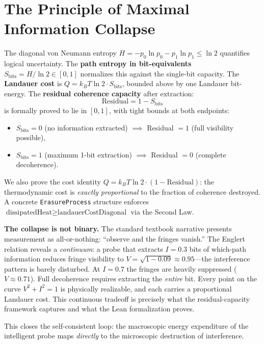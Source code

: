 \documentclass[10pt, a4paper]{article}
\begin{document}
\section{The Principle of Maximal Information Collapse}

The diagonal von Neumann entropy $H = -p_0 \ln p_0 - p_1 \ln p_1 \le \ln 2$ quantifies logical uncertainty. The \textbf{path entropy in bit-equivalents} $S_{\text{bits}} = H / \ln 2 \in [0, 1]$ normalizes this against the single-bit capacity. The \textbf{Landauer cost} is $Q = k_B T \ln 2 \cdot S_{\text{bits}}$, bounded above by one Landauer bit-energy. The \textbf{residual coherence capacity} after extraction:
\[
\text{Residual} = 1 - S_{\text{bits}}
\]
is formally proved to lie in $[0, 1]$, with tight bounds at both endpoints:
\begin{itemize}
\item $S_{\text{bits}} = 0$ (no information extracted) $\implies$ Residual $= 1$ (full visibility possible),
\item $S_{\text{bits}} = 1$ (maximum 1-bit extraction) $\implies$ Residual $= 0$ (complete decoherence).
\end{itemize}
We also prove the cost identity $Q = k_B T \ln 2 \cdot (1 - \text{Residual})$: the thermodynamic cost is \emph{exactly proportional} to the fraction of coherence destroyed. A concrete \texttt{ErasureProcess} structure enforces $\text{dissipatedHeat} \ge \text{landauerCostDiagonal}$ via the Second Law.

\textbf{The collapse is not binary.} The standard textbook narrative presents measurement as all-or-nothing: ``observe and the fringes vanish.'' The Englert relation reveals a \emph{continuum}: a probe that extracts $I = 0.3$ bits of which-path information reduces fringe visibility to $V = \sqrt{1 - 0.09} \approx 0.95$---the interference pattern is barely disturbed. At $I = 0.7$ the fringes are heavily suppressed ($V \approx 0.71$). Full decoherence requires extracting the \emph{entire} bit. Every point on the curve $V^2 + I^2 = 1$ is physically realizable, and each carries a proportional Landauer cost. This continuous tradeoff is precisely what the residual-capacity framework captures and what the Lean formalization proves.

This closes the self-consistent loop: the macroscopic energy expenditure of the intelligent probe maps \emph{directly} to the microscopic destruction of interference.

\end{document}
